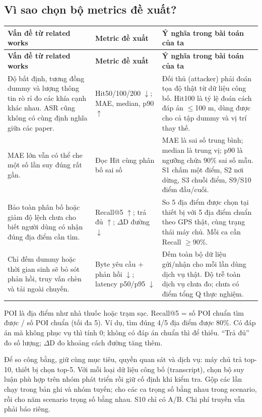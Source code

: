 \documentclass[10pt,a4paper]{article}
\begin{document}
\subsection{Vì sao chọn bộ metrics đề xuất?}\label{sub:1.2}
\begingroup\small
\begin{longtable}{@{}P{5.513cm}P{4.135cm}P{6.990cm}@{}}
\toprule
\textbf{Vấn đề từ related works} & \textbf{Metric đề xuất} & \textbf{Ý nghĩa trong bài toán của ta}\\\midrule
\endfirsthead
\toprule
\textbf{Vấn đề từ related works} & \textbf{Metric đề xuất} & \textbf{Ý nghĩa trong bài toán của ta}\\\midrule
\endhead
\bottomrule\endfoot
Độ bất định, tương đồng dummy và lượng thông tin rò rỉ đo các khía cạnh khác nhau. ASR cũng không có cùng định nghĩa giữa các paper. & Hit50/100/200 $\downarrow$; MAE, median, p90 $\uparrow$ & Đối thủ (attacker) phải đoán tọa độ thật từ dữ liệu công bố. Hit100 là tỷ lệ đoán cách đáp án $\le$100 m, dùng được cho cả tập dummy và vị trí thay thế.\\
\addlinespace[3pt]
MAE lớn vẫn có thể che một số lần suy đúng rất gần. & Đọc Hit cùng phân bố sai số & MAE là sai số trung bình; median là trung vị; p90 là ngưỡng chứa 90\% sai số mẫu. S1 chấm một điểm, S2 nơi dừng, S3 chuỗi điểm, S9/S10 điểm đầu/cuối.\\
\addlinespace[3pt]
Bảo toàn phân bố hoặc giảm độ lệch chưa cho biết người dùng có nhận đúng địa điểm cần tìm. & Recall@5 $\uparrow$; trả đủ $\uparrow$; $\Delta$D đường $\downarrow$ & So 5 địa điểm được chọn tại thiết bị với 5 địa điểm chuẩn theo GPS thật, cùng trạng thái máy chủ. Mỗi ca cần Recall $\ge$90\%.\\
\addlinespace[3pt]
Chỉ đếm dummy hoặc thời gian sinh sẽ bỏ sót phản hồi, truy vấn chèn và tải ngoài chuyến. & Byte yêu cầu + phản hồi $\downarrow$; latency p50/p95 $\downarrow$ & Đếm toàn bộ dữ liệu gửi/nhận cho mỗi lần dùng dịch vụ thật. Độ trễ toàn dịch vụ chưa đo; chưa có điểm tổng Q thực nghiệm.\\
\end{longtable}
\endgroup
POI là địa điểm như nhà thuốc hoặc trạm sạc. Recall@5 = số POI chuẩn tìm được / số POI chuẩn (tối đa 5). Ví dụ, tìm đúng 4/5 địa điểm được 80\%. Có đáp án mà không phục vụ thì tính 0; không có đáp án chuẩn thì để thiếu. “Trả đủ” đo số lượng; $\Delta$D đo khoảng cách đường tăng thêm.

Để so công bằng, giữ cùng mục tiêu, quyền quan sát và dịch vụ: máy chủ trả top-10, thiết bị chọn top-5. Với mỗi loại dữ liệu công bố (transcript), chọn bộ suy luận phù hợp trên nhóm phát triển rồi giữ cố định khi kiểm tra. Gộp các lần chạy trong bản ghi và nhóm tuyến; cho các ca trọng số bằng nhau trong scenario, rồi cho năm scenario trọng số bằng nhau. S10 chỉ có A/B. Chi phí truyền vẫn phải báo riêng.
\end{document}
